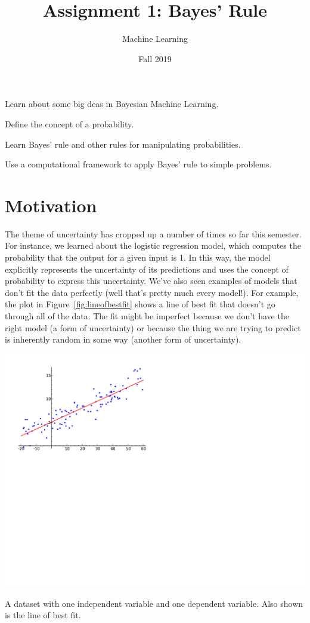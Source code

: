 \documentclass[assignment01_Solutions]{subfiles}
\title{Assignment 1: Bayes' Rule}
\author{Machine Learning}
\date{Fall 2019}
\begin{document}
\maketitle
\thispagestyle{firstpage}


\begin{learningobjectives}
\bi
\item Learn about some big deas in Bayesian Machine Learning.
\item Define the concept of a probability.
\item Learn Bayes' rule and other rules for manipulating probabilities.
\item Use a computational framework to apply Bayes' rule to simple problems.
\ei
\end{learningobjectives}

\section{Motivation}
The theme of uncertainty has cropped up a number of times so far this semester.  For instance, we learned about the logistic regression model, which computes the probability that the output for a given input is 1.  In this way, the model explicitly represents the uncertainty of its predictions and uses the concept of probability to express this uncertainty.  We’ve also seen examples of models that don’t fit the data perfectly (well that's pretty much every model!).  For example, the plot in Figure~\ref{fig:lineofbestfit} shows a line of best fit that doesn't go through all of the data.  The fit might be imperfect because we don't have the right model (a form of uncertainty) or because the thing we are trying to predict is inherently random in some way (another form of uncertainty).
\begin{marginfigure}
\includegraphics[width=\linewidth]{figures/line_of_best_fit.pdf}
\caption{A dataset with one independent variable and one dependent variable.  Also shown is the line of best fit.\label{fig:lineofbestfit}}
\end{marginfigure}
\end{document}
